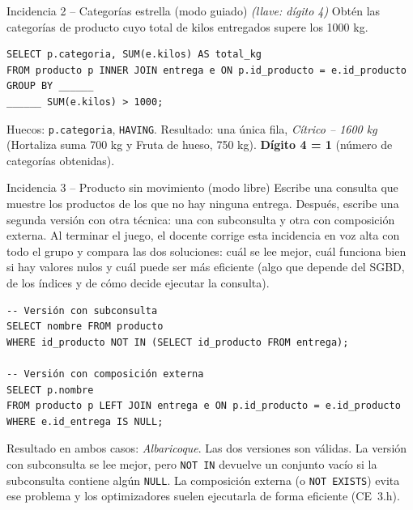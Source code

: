 \documentclass[11pt,a4paper]{article}
\begin{document}
\begin{reto}{Incidencia 2 -- Categorías estrella (modo guiado) \emph{(llave: dígito 4)}}
Obtén las categorías de producto cuyo total de kilos entregados supere los 1000 kg.
\begin{lstlisting}
SELECT p.categoria, SUM(e.kilos) AS total_kg
FROM producto p INNER JOIN entrega e ON p.id_producto = e.id_producto
GROUP BY ______
______ SUM(e.kilos) > 1000;
\end{lstlisting}
\end{reto}
\begin{solucion}
Huecos: \texttt{p.categoria}, \texttt{HAVING}.
Resultado: una única fila, \emph{Cítrico -- 1600 kg} (Hortaliza suma 700 kg y Fruta de
hueso, 750 kg). \textbf{Dígito 4 = 1} (número de categorías obtenidas).
\end{solucion}

\begin{reto}{Incidencia 3 -- Producto sin movimiento (modo libre)}
Escribe una consulta que muestre los productos de los que no hay ninguna entrega.
Después, escribe una segunda versión con otra técnica: una con subconsulta y otra con
composición externa. Al terminar el juego, el docente corrige esta incidencia en voz alta con
todo el grupo y compara las dos soluciones: cuál se lee mejor, cuál funciona bien si hay
valores nulos y cuál puede ser más eficiente (algo que depende del SGBD, de los índices y de
cómo decide ejecutar la consulta).
\end{reto}
\begin{solucion}
\begin{lstlisting}
-- Versión con subconsulta
SELECT nombre FROM producto
WHERE id_producto NOT IN (SELECT id_producto FROM entrega);

-- Versión con composición externa
SELECT p.nombre
FROM producto p LEFT JOIN entrega e ON p.id_producto = e.id_producto
WHERE e.id_entrega IS NULL;
\end{lstlisting}
Resultado en ambos casos: \emph{Albaricoque}. Las dos versiones son válidas. La versión con
subconsulta se lee mejor, pero \texttt{NOT IN} devuelve un conjunto vacío si la subconsulta
contiene algún \texttt{NULL}. La composición externa (o \texttt{NOT EXISTS}) evita ese
problema y los optimizadores suelen ejecutarla de forma eficiente (CE~3.h).
\end{solucion}
\end{document}
